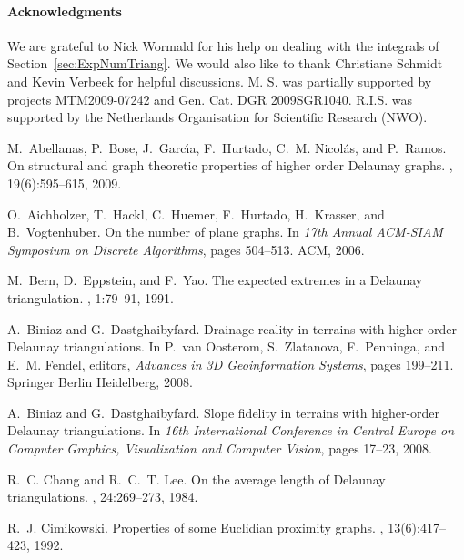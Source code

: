 \documentclass {journal}
\begin{document}
\paragraph{Acknowledgments} We are grateful to Nick Wormald for his help on dealing with the integrals of Section~\ref{sec:ExpNumTriang}. We would also like to thank Christiane Schmidt and Kevin Verbeek for helpful discussions.
M. S. was partially supported by projects MTM2009-07242 and Gen. Cat. DGR
2009SGR1040.
R.I.S. was supported by the Netherlands Organisation for
  Scientific Research (NWO).



\begin{thebibliography}{99}

M.~Abellanas, P.~Bose, J.~Garc\'{\i}a, F.~Hurtado, C.~M.
Nicol\'as, and
  P.~Ramos.
\newblock On structural and graph theoretic properties of higher order
  {D}elaunay graphs.
, 19(6):595--615, 2009.

O.~Aichholzer, T.~Hackl, C.~Huemer, F.~Hurtado, H.~Krasser, and
B.~Vogtenhuber.
\newblock On the number of plane graphs.
\newblock In {\em 17th Annual ACM-SIAM Symposium on Discrete Algorithms}, pages
  504--513. ACM, 2006.

M.~Bern, D.~Eppstein, and F.~Yao.
\newblock The expected extremes in a {Delaunay} triangulation.
, 1:79--91, 1991.

A.~Biniaz and G.~Dastghaibyfard.
\newblock Drainage reality in terrains with higher-order {D}elaunay
  triangulations.
\newblock In P.~van Oosterom, S.~Zlatanova, F.~Penninga, and E.~M. Fendel,
  editors, {\em Advances in 3D Geoinformation Systems}, pages 199--211.
  Springer Berlin Heidelberg, 2008.

A.~Biniaz and G.~Dastghaibyfard.
\newblock Slope fidelity in terrains with higher-order {D}elaunay
  triangulations.
\newblock In {\em 16th International Conference in Central Europe on Computer
  Graphics, Visualization and Computer Vision}, pages 17--23, 2008.

R.~C. Chang and R.~C.~T. Lee.
\newblock On the average length of {Delaunay} triangulations.
, 24:269--273, 1984.

R.~J. Cimikowski.
\newblock Properties of some {Euclidian} proximity graphs.
, 13(6):417--423, 1992.


\end{thebibliography}
\end{document}
